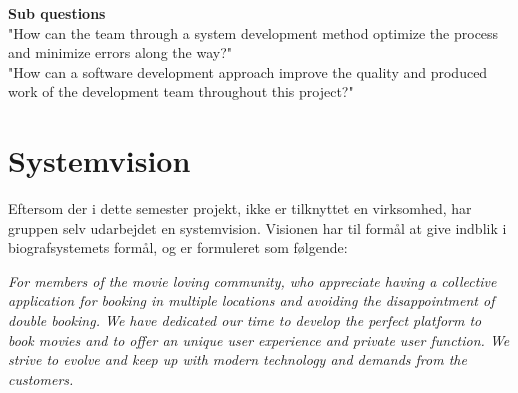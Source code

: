 \textbf{Sub questions} \\
"How can the team through a system development method optimize the process and minimize errors along the way?" \\

"How can a software development approach improve the quality and produced work of the development team throughout this project?"\\

\section{Systemvision}
Eftersom der i dette semester projekt, ikke er tilknyttet en virksomhed, har gruppen selv udarbejdet en systemvision.
Visionen har til formål at give indblik i biografsystemets formål, og er formuleret som følgende: \\

\begin{center}
    \textit{For members of the movie loving community, who appreciate having a collective application for booking 
    in multiple locations and avoiding the disappointment of double booking. We have dedicated our 
    time to develop the perfect platform to book movies and to offer an unique user experience and private user function. 
    We strive to evolve and keep up with modern technology and demands from the customers.}
\end{center}
















